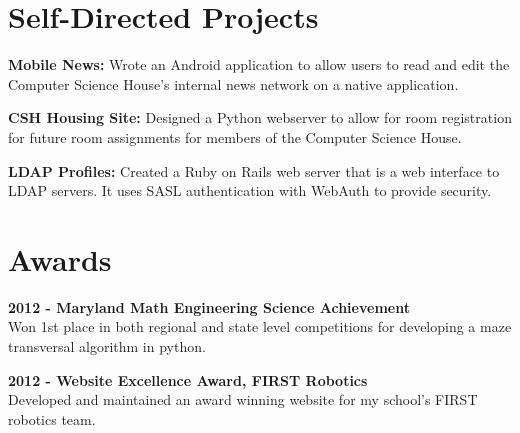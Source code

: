 \documentclass[10pt]{article} %
\begin{document}
{\begin{minipage}[t]{0.44\textwidth}
\section{Self-Directed Projects}
    \begin{sloppypar}
        {\bf Mobile News:} Wrote an Android application to allow users to read and edit 
        the Computer Science House's internal news network on a native application. \\
    \end{sloppypar} 
    \begin{sloppypar}
        {\bf CSH Housing Site:} Designed a Python webserver to allow for room registration for
        future room assignments for members of the Computer Science House.\\
    \end{sloppypar}
    \begin{sloppypar}
        {\bf LDAP Profiles:} Created a Ruby on Rails web server that is a web interface to LDAP
        servers. It uses  SASL authentication with WebAuth to provide security. \\
    \end{sloppypar}
    

\section{Awards} 

\begin{sloppypar}
    {\bf 2012 - Maryland Math Engineering Science Achievement \\}Won 1st place in both regional and state level competitions for developing a maze transversal algorithm in python.
\end{sloppypar}

\bigskip

\begin{sloppypar}
    {\bf 2012 - Website Excellence Award, FIRST Robotics \\}Developed and maintained 
    an award winning website for my school's FIRST robotics team.
\end{sloppypar}

\bigskip


\end{minipage}}
\end{document}
